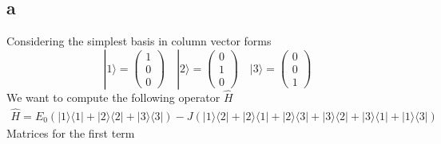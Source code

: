 \documentclass[letter]{article}
\begin{document}
\subsection*{a} 
Considering the simplest basis in column vector forms 
\[
| 1 \rangle = \begin{pmatrix} 1\\0\\0 \end{pmatrix} 
\quad
| 2 \rangle = \begin{pmatrix} 0\\1\\0 \end{pmatrix} 
\quad
| 3 \rangle = \begin{pmatrix} 0\\0\\1 \end{pmatrix} 
\] 
We want to compute the following operator $\hat{H}$ 
\begin{align*}
	\hat{H}= 
	E_0\left(
	| 1 \rangle \langle 1 |  + | 2 \rangle \langle 2 |  + | 3 \rangle \langle 3 | 
	\right) - J
	\left(
	| 1 \rangle \langle 2 | + | 2 \rangle \langle 1  | +
	| 2 \rangle \langle 3 | + | 3 \rangle \langle 2 | + 
	| 3 \rangle \langle 1 | + | 1 \rangle \langle 3 |  
	\right) 
\end{align*}
Matrices for the first term
\end{document}
